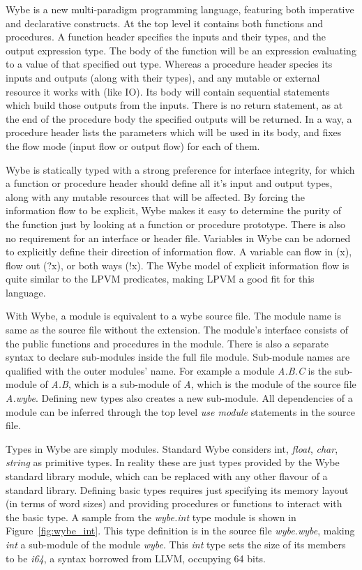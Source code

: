 Wybe is a new multi-paradigm programming language, featuring both imperative
and declarative constructs. At the top level it contains both functions and
procedures. A function header specifies the inputs and their types, and the
output expression type. The body of the function will be an expression
evaluating to a value of that specified out type. Whereas a procedure header
species its inputs and outputs (along with their types), and any mutable or
external resource it works with (like IO). Its body will contain sequential
statements which build those outputs from the inputs. There is no return
statement, as at the end of the procedure body the specified outputs will be
returned. In a way, a procedure header lists the parameters which will be used
in its body, and fixes the flow mode (input flow or output flow) for each of
them.

Wybe is statically typed with a strong preference for interface integrity, for
which a function or procedure header should define all it's input and output
types, along with any mutable resources that will be affected. By forcing the
information flow to be explicit, Wybe makes it easy to determine the purity of
the function just by looking at a function or procedure prototype. There is
also no requirement for an interface or header file. Variables in Wybe can be
adorned to explicitly define their direction of information flow. A variable
can flow in (x), flow out (?x), or both ways (!x). The Wybe model of explicit
information flow is quite similar to the LPVM predicates, making LPVM a good
fit for this language. 

With Wybe, a module is equivalent to a wybe source file. The module name is
same as the source file without the extension. The module's interface consists
of the public functions and procedures in the module. There is also a separate
syntax to declare sub-modules inside the full file module. Sub-module names are
qualified with the outer modules' name. For example a module \textit{A.B.C} is
the sub-module of \textit{A.B}, which is a sub-module of \textit{A}, which is
the module of the source file \textit{A.wybe}. Defining new types also creates
a new sub-module. All dependencies of a module can be inferred through the top
level \textit{use module} statements in the source file.

Types in Wybe are simply modules. Standard Wybe considers {int},
\textit{float}, \textit{char}, \textit{string} as primitive types. In reality
these are just types provided by the Wybe standard library module, which can be
replaced with any other flavour of a standard library. Defining basic types
requires just specifying its memory layout (in terms of word sizes) and
providing procedures or functions to interact with the basic type. A sample
from the \textit{wybe.int} type module is shown in Figure~\ref{fig:wybe_int}. This
type definition is in the source file \textit{wybe.wybe}, making \textit{int} a sub-module
of the module \textit{wybe}. This \textit{int} type sets the size of its
members to be \textit{i64}, a syntax borrowed from LLVM, occupying 64 bits. 

